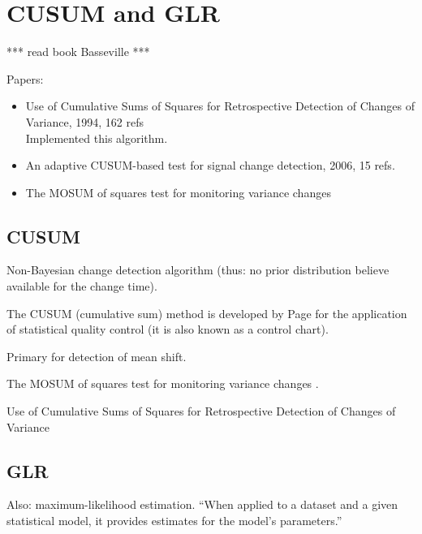 \section{CUSUM and GLR}\label{cusum-glr}

*** read book Basseville \cite{basseville1993detection} ***


Papers:
\begin{itemize}
  \item Use of Cumulative Sums of Squares for Retrospective Detection of Changes of Variance, 1994, 162 refs \cite{inclan1994use} \\
  Implemented this algorithm.
  \item An adaptive CUSUM-based test for signal change detection, 2006, 15 refs. \cite{alippi2006adaptive}
  \item The MOSUM of squares test for monitoring variance changes \cite{hsu2007mosum}
\end{itemize}


\subsection{CUSUM}
Non-Bayesian change detection algorithm (thus: no prior distribution believe available for the change time).

The CUSUM (cumulative sum) method is developed by Page \cite{page1954continuous} for the application of statistical quality control (it is also known as a control chart).

Primary for detection of mean shift.

The MOSUM of squares test for monitoring variance changes \cite{hsu2007mosum}.

Use of Cumulative Sums of Squares for Retrospective Detection of Changes of Variance \cite{inclan1994use}


\subsection{GLR}
Also: maximum-likelihood estimation. ``When applied to a dataset and a given statistical model, it provides estimates for the model's parameters.''